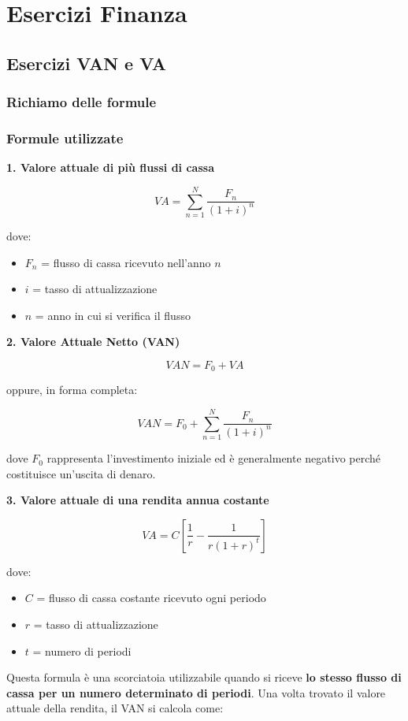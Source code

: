 \chapter{Esercizi Finanza}
\section{Esercizi VAN e VA}

\subsection{Richiamo delle formule}
\subsection*{Formule utilizzate}

\noindent\textbf{1. Valore attuale di più flussi di cassa}

\[
VA=\sum_{n=1}^{N}\frac{F_n}{(1+i)^n}
\]

\noindent dove:
\begin{itemize}
    \item $F_n$ = flusso di cassa ricevuto nell'anno $n$
    \item $i$ = tasso di attualizzazione
    \item $n$ = anno in cui si verifica il flusso
\end{itemize}

\noindent\textbf{2. Valore Attuale Netto (VAN)}

\[
VAN=F_0+VA
\]

\noindent oppure, in forma completa:

\[
VAN=F_0+\sum_{n=1}^{N}\frac{F_n}{(1+i)^n}
\]

\noindent dove $F_0$ rappresenta l'investimento iniziale ed è generalmente
negativo perché costituisce un'uscita di denaro.

\noindent\textbf{3. Valore attuale di una rendita annua costante}

\[
VA=C\left[
\frac{1}{r}
-\frac{1}{r(1+r)^t}
\right]
\]

\noindent dove:
\begin{itemize}
    \item $C$ = flusso di cassa costante ricevuto ogni periodo
    \item $r$ = tasso di attualizzazione
    \item $t$ = numero di periodi
\end{itemize}

\noindent Questa formula è una scorciatoia utilizzabile quando si riceve
\textbf{lo stesso flusso di cassa per un numero determinato di periodi}.
Una volta trovato il valore attuale della rendita, il VAN si calcola come:

